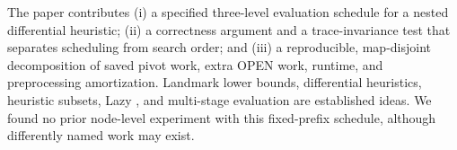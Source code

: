 The paper contributes (i) a specified three-level evaluation schedule for a
nested differential heuristic; (ii) a correctness argument and a
trace-invariance test that separates scheduling from search order; and (iii)
a reproducible, map-disjoint decomposition of saved pivot work, extra OPEN
work, runtime, and preprocessing amortization.  Landmark lower bounds,
differential heuristics, heuristic subsets, Lazy \Astar{}, and multi-stage
evaluation are established ideas.  We found no prior node-level experiment
with this fixed-prefix schedule, although differently named work may exist.
